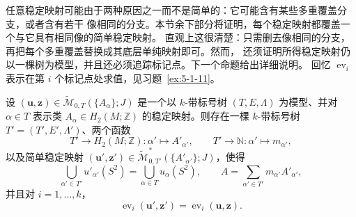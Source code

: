 任意稳定映射可能由于两种原因之一而不是简单的：它可能含有某些多重覆盖分支，或者含有若干
像相同的分支。本节余下部分将证明，每个稳定映射都覆盖一个与它具有相同像的简单稳定映射。
直观上这很清楚：只需删去像相同的分支，再把每个多重覆盖替换成其底层单纯映射即可。然而，
还须证明所得稳定映射仍以一棵树为模型，并且还必须追踪标记点。下一个命题给出详细说明。
回忆 $\operatorname{ev}_i$ 表示在第 $i$ 个标记点处求值，见习题~\ref{ex:5-1-11}。

\begin{proposition}\label{prop:6-1-2}
设
$(\mathbf u,\mathbf z)\in\widetilde{\mathcal M}_{0,T}(\{A_\alpha\};J)$
是一个以 $k$-带标号树 $(T,E,\Lambda)$ 为模型、并对 $\alpha\in T$ 表示类
$A_\alpha\in H_2(M;\mathbb Z)$ 的稳定映射。则存在一棵 $k$-带标号树
$T'=(T',E',\Lambda')$、两个函数
\[
  T'\longrightarrow H_2(M;\mathbb Z):\alpha'\longmapsto A'_{\alpha'},
  \qquad
  T'\longrightarrow\mathbb N:\alpha'\longmapsto m_{\alpha'},
\]
以及简单稳定映射
$(\mathbf u',\mathbf z')\in
\widetilde{\mathcal M}^*_{0,T'}(\{A'_{\alpha'}\};J)$，使得
\[
  \bigcup_{\alpha'\in T'}u'_{\alpha'}(S^2)
  =\bigcup_{\alpha\in T}u_\alpha(S^2),
  \qquad
  A=\sum_{\alpha'\in T'}m_{\alpha'}A'_{\alpha'},
\]
并且对 $i=1,\ldots,k$，
\[
  \operatorname{ev}_i(\mathbf u',\mathbf z')
  =\operatorname{ev}_i(\mathbf u,\mathbf z).
\]
\end{proposition}

